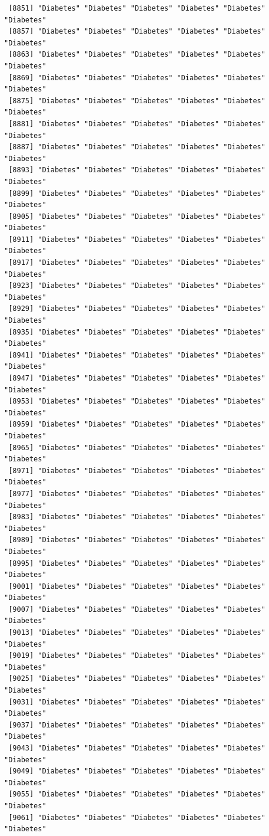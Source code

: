 \documentclass[
  letterpaper,
  DIV=11,
  numbers=noendperiod]{scrartcl}
\begin{document}
\begin{verbatim}
 [8851] "Diabetes" "Diabetes" "Diabetes" "Diabetes" "Diabetes" "Diabetes"
 [8857] "Diabetes" "Diabetes" "Diabetes" "Diabetes" "Diabetes" "Diabetes"
 [8863] "Diabetes" "Diabetes" "Diabetes" "Diabetes" "Diabetes" "Diabetes"
 [8869] "Diabetes" "Diabetes" "Diabetes" "Diabetes" "Diabetes" "Diabetes"
 [8875] "Diabetes" "Diabetes" "Diabetes" "Diabetes" "Diabetes" "Diabetes"
 [8881] "Diabetes" "Diabetes" "Diabetes" "Diabetes" "Diabetes" "Diabetes"
 [8887] "Diabetes" "Diabetes" "Diabetes" "Diabetes" "Diabetes" "Diabetes"
 [8893] "Diabetes" "Diabetes" "Diabetes" "Diabetes" "Diabetes" "Diabetes"
 [8899] "Diabetes" "Diabetes" "Diabetes" "Diabetes" "Diabetes" "Diabetes"
 [8905] "Diabetes" "Diabetes" "Diabetes" "Diabetes" "Diabetes" "Diabetes"
 [8911] "Diabetes" "Diabetes" "Diabetes" "Diabetes" "Diabetes" "Diabetes"
 [8917] "Diabetes" "Diabetes" "Diabetes" "Diabetes" "Diabetes" "Diabetes"
 [8923] "Diabetes" "Diabetes" "Diabetes" "Diabetes" "Diabetes" "Diabetes"
 [8929] "Diabetes" "Diabetes" "Diabetes" "Diabetes" "Diabetes" "Diabetes"
 [8935] "Diabetes" "Diabetes" "Diabetes" "Diabetes" "Diabetes" "Diabetes"
 [8941] "Diabetes" "Diabetes" "Diabetes" "Diabetes" "Diabetes" "Diabetes"
 [8947] "Diabetes" "Diabetes" "Diabetes" "Diabetes" "Diabetes" "Diabetes"
 [8953] "Diabetes" "Diabetes" "Diabetes" "Diabetes" "Diabetes" "Diabetes"
 [8959] "Diabetes" "Diabetes" "Diabetes" "Diabetes" "Diabetes" "Diabetes"
 [8965] "Diabetes" "Diabetes" "Diabetes" "Diabetes" "Diabetes" "Diabetes"
 [8971] "Diabetes" "Diabetes" "Diabetes" "Diabetes" "Diabetes" "Diabetes"
 [8977] "Diabetes" "Diabetes" "Diabetes" "Diabetes" "Diabetes" "Diabetes"
 [8983] "Diabetes" "Diabetes" "Diabetes" "Diabetes" "Diabetes" "Diabetes"
 [8989] "Diabetes" "Diabetes" "Diabetes" "Diabetes" "Diabetes" "Diabetes"
 [8995] "Diabetes" "Diabetes" "Diabetes" "Diabetes" "Diabetes" "Diabetes"
 [9001] "Diabetes" "Diabetes" "Diabetes" "Diabetes" "Diabetes" "Diabetes"
 [9007] "Diabetes" "Diabetes" "Diabetes" "Diabetes" "Diabetes" "Diabetes"
 [9013] "Diabetes" "Diabetes" "Diabetes" "Diabetes" "Diabetes" "Diabetes"
 [9019] "Diabetes" "Diabetes" "Diabetes" "Diabetes" "Diabetes" "Diabetes"
 [9025] "Diabetes" "Diabetes" "Diabetes" "Diabetes" "Diabetes" "Diabetes"
 [9031] "Diabetes" "Diabetes" "Diabetes" "Diabetes" "Diabetes" "Diabetes"
 [9037] "Diabetes" "Diabetes" "Diabetes" "Diabetes" "Diabetes" "Diabetes"
 [9043] "Diabetes" "Diabetes" "Diabetes" "Diabetes" "Diabetes" "Diabetes"
 [9049] "Diabetes" "Diabetes" "Diabetes" "Diabetes" "Diabetes" "Diabetes"
 [9055] "Diabetes" "Diabetes" "Diabetes" "Diabetes" "Diabetes" "Diabetes"
 [9061] "Diabetes" "Diabetes" "Diabetes" "Diabetes" "Diabetes" "Diabetes"

\end{verbatim}
\end{document}
